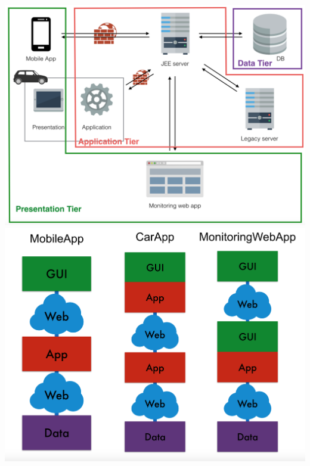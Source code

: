 \documentclass[]{article}
\begin{document}
\includegraphics[width=1.00000\textwidth,height=1.00000\textwidth]{./images/sysApp.png}
\includegraphics[width=1.00000\textwidth,height=1.00000\textwidth]{./images/layers.png}
\end{document}
